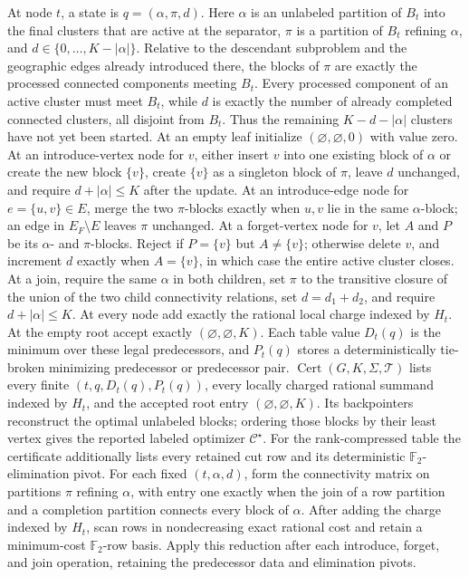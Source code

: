 At node \(t\), a state is \(q=(\alpha,\pi,d)\).  Here \(\alpha\) is an unlabeled partition of \(B_t\) into the final clusters that are active at the separator, \(\pi\) is a partition of \(B_t\) refining \(\alpha\), and \(d\in\{0,\ldots,K-|\alpha|\}\).  Relative to the descendant subproblem and the geographic edges already introduced there, the blocks of \(\pi\) are exactly the processed connected components meeting \(B_t\).  Every processed component of an active cluster must meet \(B_t\), while \(d\) is exactly the number of already completed connected clusters, all disjoint from \(B_t\).  Thus the remaining \(K-d-|\alpha|\) clusters have not yet been started.
At an empty leaf initialize \((\varnothing,\varnothing,0)\) with value zero.  At an introduce-vertex node for \(v\), either insert \(v\) into one existing block of \(\alpha\) or create the new block \(\{v\}\), create \(\{v\}\) as a singleton block of \(\pi\), leave \(d\) unchanged, and require \(d+|\alpha|\le K\) after the update.  At an introduce-edge node for \(e=\{u,v\}\in E\), merge the two \(\pi\)-blocks exactly when \(u,v\) lie in the same \(\alpha\)-block; an edge in \(E_F\setminus E\) leaves \(\pi\) unchanged.  At a forget-vertex node for \(v\), let \(A\) and \(P\) be its \(\alpha\)- and \(\pi\)-blocks.  Reject if \(P=\{v\}\) but \(A\ne\{v\}\); otherwise delete \(v\), and increment \(d\) exactly when \(A=\{v\}\), in which case the entire active cluster closes.  At a join, require the same \(\alpha\) in both children, set \(\pi\) to the transitive closure of the union of the two child connectivity relations, set \(d=d_1+d_2\), and require \(d+|\alpha|\le K\).  At every node add exactly the rational local charge indexed by \(H_t\).  At the empty root accept exactly \((\varnothing,\varnothing,K)\).  Each table value \(D_t(q)\) is the minimum over these legal predecessors, and \(P_t(q)\) stores a deterministically tie-broken minimizing predecessor or predecessor pair.
\(\operatorname{Cert}(G,K,\Sigma,\mathcal T)\) lists every finite \((t,q,D_t(q),P_t(q))\), every locally charged rational summand indexed by \(H_t\), and the accepted root entry \((\varnothing,\varnothing,K)\).  Its backpointers reconstruct the optimal unlabeled blocks; ordering those blocks by their least vertex gives the reported labeled optimizer \(\mathcal C^\star\).  For the rank-compressed table the certificate additionally lists every retained cut row and its deterministic \(\mathbb F_2\)-elimination pivot.
For each fixed \((t,\alpha,d)\), form the connectivity matrix on partitions \(\pi\) refining \(\alpha\), with entry one exactly when the join of a row partition and a completion partition connects every block of \(\alpha\).  After adding the charge indexed by \(H_t\), scan rows in nondecreasing exact rational cost and retain a minimum-cost \(\mathbb F_2\)-row basis.  Apply this reduction after each introduce, forget, and join operation, retaining the predecessor data and elimination pivots.
